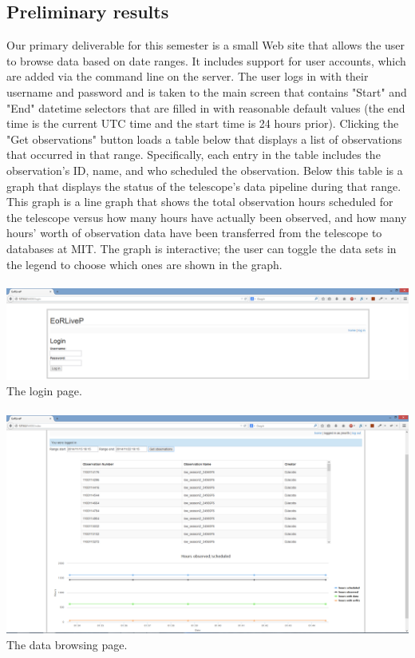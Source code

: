 \documentclass[12pt]{article}
\begin{document}
\begin{spacing}{1.5}
\section{Preliminary results}
Our primary deliverable for this semester is a small Web site that allows the user to browse data based on date ranges. It includes support for user accounts, which are added via the command line on the server. The user logs in with their username and password and is taken to the main screen that contains "Start" and "End" datetime selectors that are filled in with reasonable default values (the end time is the current UTC time and the start time is 24 hours prior). Clicking the "Get observations" button loads a table below that displays a list of observations that occurred in that range. Specifically, each entry in the table includes the observation's ID, name, and who scheduled the observation. Below this table is a graph that displays the status of the telescope's data pipeline during that range. This graph is a line graph that shows the total observation hours scheduled for the telescope versus how many hours have actually been observed, and how many hours' worth of observation data have been transferred from the telescope to databases at MIT. The graph is interactive; the user can toggle the data sets in the legend to choose which ones are shown in the graph.
\\ \\
\includegraphics[width=\textwidth]{screenshot1}
The login page.
\\ \\
\includegraphics[width=\textwidth]{screenshot2}
The data browsing page.

\end{spacing}
\end{document}
